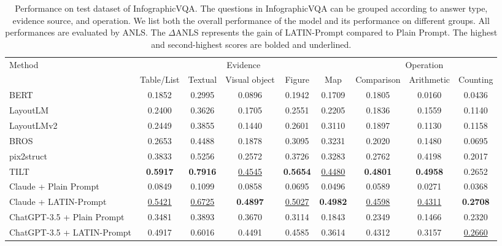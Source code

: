 \documentclass[letterpaper]{article} \usepackage{aaai24_preprint}  \usepackage{times}  \usepackage{helvet}  \usepackage{courier}  \usepackage[hyphens]{url}  \usepackage{graphicx} \urlstyle{rm} \def\UrlFont{\rm}  \usepackage{natbib}  \usepackage{caption} \frenchspacing  \setlength{\pdfpagewidth}{8.5in} \setlength{\pdfpageheight}{11in} \usepackage{algorithm}
\begin{document}
\begin{table*}[t]
\begin{tabular}{@{}l|ccccc|ccc@{}}
\toprule
\multirow{2}{*}{Method} & \multicolumn{5}{c|}{Evidence}                                                           & \multicolumn{3}{c}{Operation}                       \\
& Table/List      & Textual         & Visual object   & Figure          & Map             & Comparison      & Arithmetic      & Counting        \\ \midrule
BERT                    & 0.1852          & 0.2995          & 0.0896          & 0.1942          & 0.1709          & 0.1805          & 0.0160          & 0.0436          \\
LayoutLM          & 0.2400          & 0.3626          & 0.1705          & 0.2551          & 0.2205          & 0.1836          & 0.1559          & 0.1140          \\
LayoutLMv2              & 0.2449          & 0.3855          & 0.1440          & 0.2601          & 0.3110          & 0.1897          & 0.1130          & 0.1158          \\
BROS                    & 0.2653          & 0.4488          & 0.1878          & 0.3095          & 0.3231          & 0.2020          & 0.1480          & 0.0695          \\
pix2struct              & 0.3833          & 0.5256          & 0.2572          & 0.3726          & 0.3283          & 0.2762          & 0.4198          & 0.2017          \\
TILT& \textbf{0.5917} & \textbf{0.7916} & \underline{0.4545}    & \textbf{0.5654} & \underline{0.4480}    & \textbf{0.4801} & \textbf{0.4958} & 0.2652          \\ \midrule
Claude + Plain Prompt   & 0.0849          & 0.1099          & 0.0858          & 0.0695          & 0.0496          & 0.0589          & 0.0271          & 0.0368          \\
Claude + LATIN-Prompt   & \underline{0.5421}    & \underline{0.6725}    & \textbf{0.4897} & \underline{0.5027}    & \textbf{0.4982} & \underline{0.4598}    & \underline{0.4311}    & \textbf{0.2708} \\ \cmidrule(l){1-9} 
ChatGPT-3.5 + Plain Prompt  & 0.3481          & 0.3893          & 0.3670          & 0.3114          & 0.1843          & 0.2349          & 0.1466          & 0.2320          \\
ChatGPT-3.5 + LATIN-Prompt  & 0.4917          & 0.6016          & 0.4491          & 0.4585          & 0.3614          & 0.4312          & 0.3157          & \underline{0.2660}    \\ \bottomrule
\end{tabular}
\caption{
Performance on test dataset of InfographicVQA.
The questions in InfographicVQA can be grouped according to answer type, evidence source, and operation.
We list both the overall performance of the model and its performance on different groups.
All performances are evaluated by ANLS.
The $\Delta$ANLS represents the gain of LATIN-Prompt compared to Plain Prompt.
The highest and second-highest scores are bolded and underlined.
}
\label{tab:exp_infographicvqa}
\end{table*}
\end{document}
